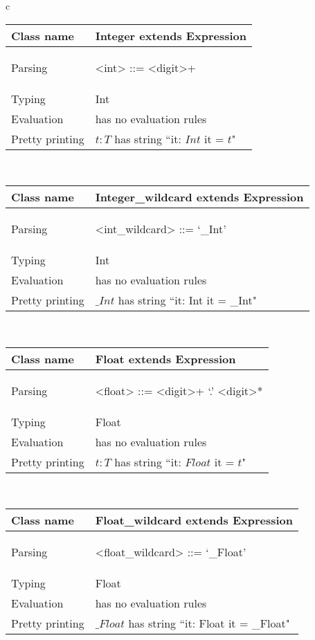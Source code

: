 \documentclass[12pt]{article}
\begin{document}
\begin{tabular}{c}


\begin{tabular}{|l|p{15cm}|}
\hline
Class name & Integer extends Expression\\
\hline
Parsing & 
\begin{grammar}
<int> ::=  <digit>+ 
\end{grammar}  \\
\hline
Typing &  Int
\\
\hline
Evaluation &  has no evaluation rules \\
\hline
Pretty printing &  $t:T$  has string  ``it: $Int$   it = $t$" \\
\hline
\end{tabular} 

\\

\begin{tabular}{|l|p{15cm}|}
\hline
\hline
Class name & Integer_wildcard extends Expression\\
\hline
Parsing & 
\begin{grammar}
<int_wildcard> ::=  `_Int'
\end{grammar}  \\
\hline
Typing &  Int
\\
\hline
Evaluation &  has no evaluation rules \\
\hline
Pretty printing &  $\_Int$  has string  ``it: Int it = _Int" \\
\hline
\end{tabular} 

\\

\begin{tabular}{|l|p{15cm}|}
\hline
\hline
Class name & Float extends Expression \\
\hline
Parsing & 
\begin{grammar}
<float> ::=  <digit>+ `.' <digit>* 
\end{grammar}  \\
\hline
Typing &  Float
\\
\hline
Evaluation &  has no evaluation rules \\
\hline
Pretty printing &  $t:T$  has string  ``it: $Float$   it = $t$" \\
\hline
\end{tabular} 

\\

\begin{tabular}{|l|p{15cm}|}
\hline
\hline
Class name & Float_wildcard extends Expression\\
\hline
Parsing & 
\begin{grammar}
<float_wildcard> ::=  `_Float'
\end{grammar}  \\
\hline
Typing &  Float
\\
\hline
Evaluation &  has no evaluation rules \\
\hline
Pretty printing &  $\_Float$  has string  ``it: Float it = _Float" \\
\hline
\end{tabular} 

\end{tabular}
\end{document}
